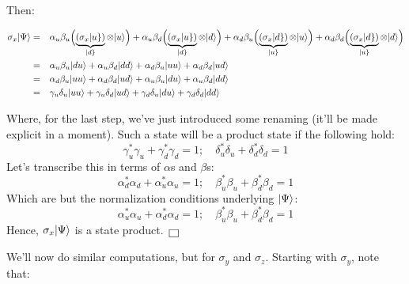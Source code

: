 \documentclass[solutions.tex]{subfiles}
\begin{document}
Then:

\begin{equation*}\begin{aligned}
	\sigma_x\ket{\Psi} &=&&
		  \alpha_u\beta_u\Bigl(\underbrace{(\sigma_x\keit{u})}_{\keit{d}}\otimes\ket{u}\Bigr)
		+ \alpha_u\beta_d\Bigl(\underbrace{(\sigma_x\keit{u})}_{\keit{d}}\otimes\ket{d}\Bigr)
		+ \alpha_d\beta_u\Bigl(\underbrace{(\sigma_x\keit{d})}_{\keit{u}}\otimes\ket{u}\Bigr)
		+ \alpha_d\beta_d\Bigl(\underbrace{(\sigma_x\keit{d})}_{\keit{u}}\otimes\ket{d}\Bigr) \\
	&=&& \alpha_u\beta_u\ket{du}+ \alpha_u\beta_d\ket{dd}
		+ \alpha_d\beta_u\ket{uu} + \alpha_d\beta_d\ket{ud} \\
	&=&& \alpha_d\beta_u\ket{uu} + \alpha_d\beta_d\ket{ud}
		+\alpha_u\beta_u\ket{du}+ \alpha_u\beta_d\ket{dd} \\
	&=&& \gamma_u\delta_u\ket{uu} + \gamma_u\delta_d\ket{ud}
		+\gamma_d\delta_u\ket{du}+ \gamma_d\delta_d\ket{dd} \\
\end{aligned}\end{equation*}

Where, for the last step, we've just introduced some renaming (it'll
be made explicit in a moment). Such
a state will be a product state if the following hold:
\[
	\gamma_u^*\gamma_u + \gamma_d^*\gamma_d = 1;\quad
	\delta_u^*\delta_u + \delta_d^*\delta_d = 1
\]
Let's transcribe this in terms of $\alpha$s and $\beta$s:
\[
	\alpha_d^*\alpha_d + \alpha_u^*\alpha_u = 1;\quad
	\beta_u^*\beta_u + \beta_d^*\beta_d = 1
\]
Which are but the normalization conditions underlying $\ket{\Psi}$:
\[
	\alpha_u^*\alpha_u + \alpha_d^*\alpha_d = 1;\quad
	\beta_u^*\beta_u + \beta_d^*\beta_d = 1
\]
Hence, $\sigma_x\ket{\Psi}$ is a state product. $\qed$

\hrr

We'll now do similar computations, but for $\sigma_y$ and $\sigma_z$. Starting
with $\sigma_y$, note that:
\end{document}
